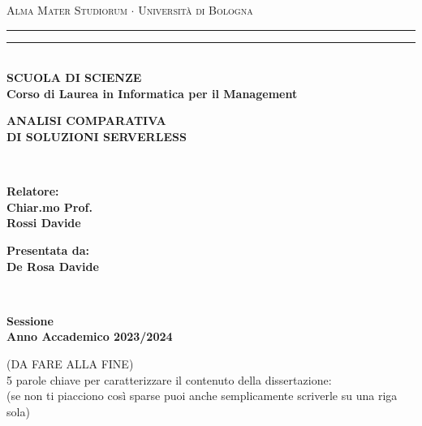 \documentclass[12pt,a4paper,twoside]{book}
\newcommand{\rom}[1]{\uppercase\expandafter{\romannumeral #1\relax}}
\begin{document}
\pagestyle{empty}
\begin{titlepage}
\begin{center}
    {{\Large{\textsc{Alma Mater Studiorum $\cdot$ Università di Bologna}}}}
    \rule[0.1cm]{\textwidth}{0.1mm}
    \rule[0.5cm]{\textwidth}{0.6mm}\\
    {\small{\bf SCUOLA DI SCIENZE\\
    Corso di Laurea in Informatica per il Management}}
\end{center}

\vspace{45mm}

\begin{center}
    {\LARGE{\bf ANALISI COMPARATIVA }}\\
    \vspace{3mm}
    {\LARGE{\bf DI SOLUZIONI SERVERLESS}}\\
\end{center}

\vspace{60mm}
\par
\noindent
\begin{minipage}[t]{0.04\textwidth}
~
\end{minipage}
\begin{minipage}[t]{0.4\textwidth}
{\large{\bf Relatore:\\
Chiar.mo Prof.\\
Rossi Davide}}
\end{minipage}
\hfill
\begin{minipage}[t]{0.4\textwidth}\raggedleft
{\large{\bf Presentata da:\\
De Rosa Davide}}
\end{minipage}
\begin{minipage}[t]{0.04\textwidth}
~
\end{minipage}

\vspace{30mm}

\begin{center}
    {\large{\bf \rom{2} Sessione\\
    Anno Accademico 2023/2024 }}
\end{center}
\end{titlepage}

\restoregeometry
\newpage
\begin{center}
    (DA FARE ALLA FINE)\\
    5 parole chiave per caratterizzare il contenuto della dissertazione:\\ (se non ti piacciono così sparse puoi anche semplicamente scriverle su una riga sola)
\end{center}
\end{document}
